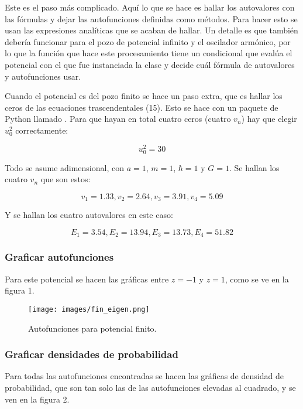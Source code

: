 \documentclass{article}
\begin{document}
Este es el paso más complicado. Aquí lo que se hace es hallar los autovalores con las fórmulas y dejar las autofunciones definidas como métodos. Para hacer esto se usan las expresiones analíticas que se acaban de hallar. Un detalle es que también debería funcionar para el pozo de potencial infinito y el oscilador armónico, por lo que la función que hace este procesamiento tiene un condicional que evalúa el potencial con el que fue instanciada la clase  y decide cuál fórmula de autovalores y autofunciones usar.

Cuando el potencial es del pozo finito se hace un paso extra, que es hallar los ceros de las ecuaciones trascendentales (15). Esto se hace con un paquete de Python llamado . Para que hayan en total cuatro ceros (cuatro $v_n$) hay que elegir $u_0^2$ correctamente:

\begin{equation}
    u_0^2=30
\end{equation}

Todo se asume adimensional, con $a=1$, $m=1$, $\hbar=1$ y $G=1$. Se hallan los cuatro $v_n$ que son estos:

\begin{equation}
    v_1=1.33, v_2=2.64, v_3=3.91, v_4=5.09
\end{equation}

Y se hallan los cuatro autovalores en este caso:

\begin{equation}
    E_1=3.54,E_2=13.94, E_3=13.73, E_4=51.82
\end{equation}

\subsubsection{Graficar autofunciones}

Para este potencial se hacen las gráficas entre $z=-1$ y $z=1$, como se ve en la figura 1.

\begin{figure}
    \texttt{[image: images/fin\_eigen.png]}
    \centering
    \caption{Autofunciones para potencial finito.}
\end{figure}

\subsubsection{Graficar densidades de probabilidad}

Para todas las autofunciones encontradas se hacen las gráficas de densidad de probabilidad, que son tan solo las de las autofunciones elevadas al cuadrado, y se ven en la figura 2.
\end{document}
